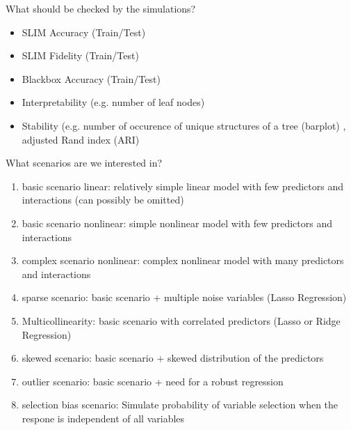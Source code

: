 What should be checked by the simulations?
\begin{itemize}
    \item SLIM Accuracy (Train/Test)
    \item SLIM Fidelity (Train/Test)
    \item Blackbox Accuracy (Train/Test)
    \item Interpretability (e.g. number of leaf nodes)
    \item Stability (e.g. number of occurence of unique structures of a tree (barplot) \citep{Zhou.2018}, adjusted Rand index (ARI) \citep{Schlosser.24.06.2019}
\end{itemize}


What scenarios are we interested in?
\begin{enumerate}
    \item basic scenario linear: relatively simple linear model with few predictors and interactions (can possibly be omitted)
    \item basic scenario nonlinear: simple nonlinear model with few predictors and interactions 
    \item complex scenario nonlinear:  complex nonlinear model with many predictors and interactions 
    \item sparse scenario: basic scenario + multiple noise variables (Lasso Regression)
    \item Multicollinearity: basic scenario with correlated predictors (Lasso or Ridge Regression)
    \item skewed scenario: basic scenario + skewed distribution of the predictors
    \item outlier scenario: basic scenario + need for a robust regression
    \item selection bias scenario: Simulate probability of variable selection when the respone is independent of all variables \citep{Hothorn.2006}
\end{enumerate}
